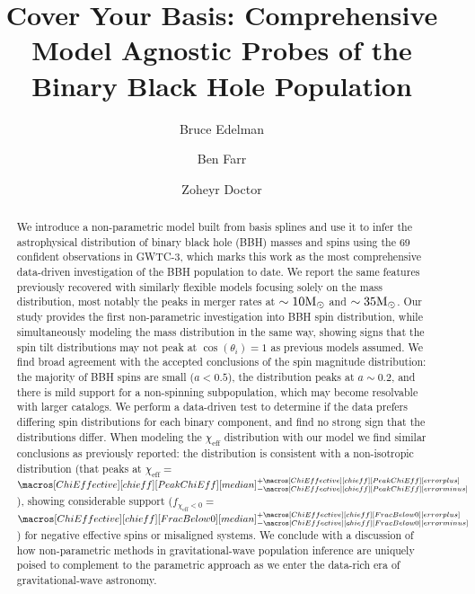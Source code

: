 \documentclass[twocolumn, linenumbers]{aastex631}
\newcommand{\msun}{\ensuremath{{\rm M}_\odot}}
\newcommand{\result}[1]{\textcolor{red}{#1}}
\newcommand{\CIPlusMinus}[1]{{#1[median]^{+#1[error plus]}_{-#1[error minus]}}}
\begin{document}
\title{Cover Your Basis: Comprehensive Model Agnostic Probes of the Binary Black Hole Population}

\author{Bruce Edelman}
\author{Ben Farr}
\author{Zoheyr Doctor}


\begin{abstract}                 
We introduce a non-parametric model built from basis splines and use it to infer the astrophysical distribution of 
binary black hole (BBH) masses and spins using the 69 confident observations in GWTC-3, which marks this work as 
the most comprehensive data-driven investigation of the BBH population to date. We report the same features previously recovered 
with similarly flexible models focusing solely on the mass distribution, most notably the peaks in merger rates at $\sim10\msun$ and $\sim35\msun$. 
Our study provides the first non-parametric investigation into BBH spin distribution, while simultaneously modeling the mass distribution in the same way, 
showing signs that the spin tilt distributions may not peak at $\cos(\theta_i) = 1$ as previous models assumed. We find broad agreement with the 
accepted conclusions of the spin magnitude distribution: the majority of BBH spins are small ($a<0.5$), the distribution peaks at $a\sim0.2$, 
and there is mild support for a non-spinning subpopulation, which may become resolvable with larger catalogs. 
We perform a data-driven test to determine if the data prefers differing spin distributions for each binary component, and 
find no strong sign that the distributions differ. When modeling the $\chi_\mathrm{eff}$ distribution with our model we find similar 
conclusions as previously reported: the distribution is consistent with a non-isotropic distribution (that peaks at $\chi_\mathrm{eff}=\,$\result{$\CIPlusMinus{\macros[ChiEffective][chieff][PeakChiEff]}$}), 
showing considerable support ($f_{\chi_\mathrm{eff}<0}=\,$\result{$\CIPlusMinus{\macros[ChiEffective][chieff][FracBelow0]}$}) for negative effective spins or misaligned systems.
We conclude with a discussion of how non-parametric methods in gravitational-wave population inference are uniquely poised to complement to 
the parametric approach as we enter the data-rich era of gravitational-wave astronomy.
\end{abstract}
\end{document}

